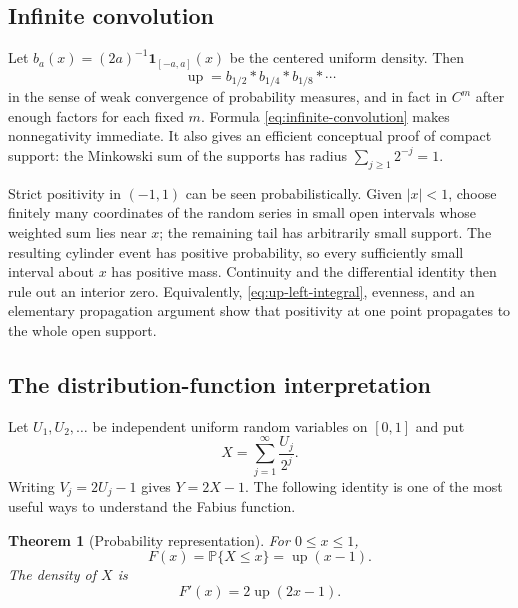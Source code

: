 \documentclass[11pt]{article}
\numberwithin{equation}{section}
\newtheorem{theorem}{Theorem}[section]
\theoremstyle{definition}
\theoremstyle{remark}
\newcommand{\upf}{\operatorname{up}}
\begin{document}
\subsection{Infinite convolution}

Let $b_a(x)=(2a)^{-1}\mathbf1_{[-a,a]}(x)$ be the centered uniform density.
Then
\begin{equation}\label{eq:infinite-convolution}
 \upf=b_{1/2}*b_{1/4}*b_{1/8}*\cdots
\end{equation}
in the sense of weak convergence of probability measures, and in fact in
$C^m$ after enough factors for each fixed $m$.  Formula
\eqref{eq:infinite-convolution} makes nonnegativity immediate.  It also gives
an efficient conceptual proof of compact support: the Minkowski sum of the
supports has radius $\sum_{j\ge1}2^{-j}=1$.

Strict positivity in $(-1,1)$ can be seen probabilistically.  Given
$|x|<1$, choose finitely many coordinates of the random series in small open
intervals whose weighted sum lies near $x$; the remaining tail has arbitrarily
small support.  The resulting cylinder event has positive probability, so
every sufficiently small interval about $x$ has positive mass.  Continuity
and the differential identity then rule out an interior zero.  Equivalently,
\eqref{eq:up-left-integral}, evenness, and an elementary propagation argument
show that positivity at one point propagates to the whole open support.

\subsection{The distribution-function interpretation}

Let $U_1,U_2,\ldots$ be independent uniform random variables on $[0,1]$ and
put
\begin{equation}\label{eq:X-random-series}
 X=\sum_{j=1}^{\infty}\frac{U_j}{2^j}.
\end{equation}
Writing $V_j=2U_j-1$ gives $Y=2X-1$.  The following identity is one of the
most useful ways to understand the Fabius function.

\begin{theorem}[Probability representation]\label{thm:probability-F}
For $0\le x\le1$,
\begin{equation}\label{eq:F-CDF}
 F(x)=\mathbb P\{X\le x\}=\upf(x-1).
\end{equation}
The density of $X$ is
\begin{equation}\label{eq:F-density}
 F'(x)=2\upf(2x-1).
\end{equation}
\end{theorem}
\end{document}
